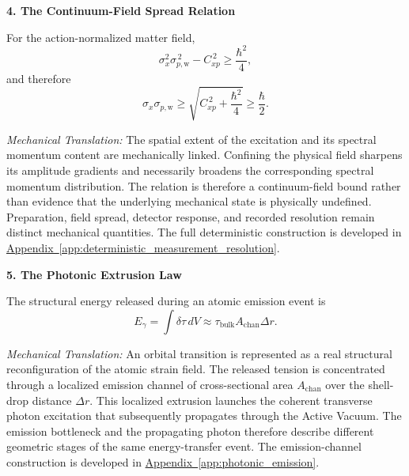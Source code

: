 \vspace{0.5em}
\noindent\textbf{4. The Continuum-Field Spread Relation}

For the action-normalized matter field,
\begin{equation}
    \sigma_x^2
    \sigma_{p,\mathrm w}^{\,2}
    -
    C_{xp}^{\,2}
    \geq
    \frac{\hbar^2}{4},
\end{equation}
and therefore
\begin{equation}
    \sigma_x
    \sigma_{p,\mathrm w}
    \geq
    \sqrt{
        C_{xp}^{\,2}
        +
        \frac{\hbar^2}{4}
    }
    \geq
    \frac{\hbar}{2}.
\end{equation}

\textit{Mechanical Translation:}
The spatial extent of the excitation and its spectral momentum content are mechanically linked. Confining the physical field sharpens its amplitude gradients and necessarily broadens the corresponding spectral momentum distribution. The relation is therefore a continuum-field bound rather than evidence that the underlying mechanical state is physically undefined. Preparation, field spread, detector response, and recorded resolution remain distinct mechanical quantities. The full deterministic construction is developed in \hyperref[app:deterministic_measurement_resolution]{Appendix~\ref*{app:deterministic_measurement_resolution}}.


\vspace{0.5em}
\noindent\textbf{5. The Photonic Extrusion Law}

The structural energy released during an atomic emission event is
\begin{equation}
    E_{\gamma}
    =
    \int
    \delta\tau\,dV
    \approx
    \tau_{\mathrm{bulk}}
    A_{\mathrm{chan}}
    \Delta r.
\end{equation}

\textit{Mechanical Translation:}
An orbital transition is represented as a real structural reconfiguration of the atomic strain field. The released tension is concentrated through a localized emission channel of cross-sectional area $A_{\mathrm{chan}}$ over the shell-drop distance $\Delta r$. This localized extrusion launches the coherent transverse photon excitation that subsequently propagates through the Active Vacuum. The emission bottleneck and the propagating photon therefore describe different geometric stages of the same energy-transfer event. The emission-channel construction is developed in \hyperref[app:photonic_emission]{Appendix~\ref*{app:photonic_emission}}.


